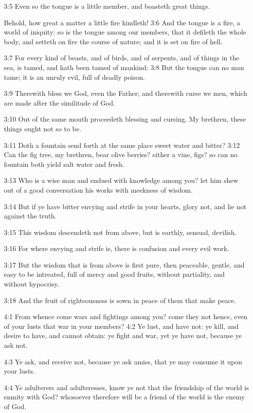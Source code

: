 3:5 Even so the tongue is a little member, and boasteth great things.

Behold, how great a matter a little fire kindleth!  3:6 And the tongue
is a fire, a world of iniquity: so is the tongue among our members,
that it defileth the whole body, and setteth on fire the course of
nature; and it is set on fire of hell.

3:7 For every kind of beasts, and of birds, and of serpents, and of
things in the sea, is tamed, and hath been tamed of mankind: 3:8 But
the tongue can no man tame; it is an unruly evil, full of deadly
poison.

3:9 Therewith bless we God, even the Father; and therewith curse we
men, which are made after the similitude of God.

3:10 Out of the same mouth proceedeth blessing and cursing. My
brethren, these things ought not so to be.

3:11 Doth a fountain send forth at the same place sweet water and
bitter?  3:12 Can the fig tree, my brethren, bear olive berries?
either a vine, figs? so can no fountain both yield salt water and
fresh.

3:13 Who is a wise man and endued with knowledge among you? let him
shew out of a good conversation his works with meekness of wisdom.

3:14 But if ye have bitter envying and strife in your hearts, glory
not, and lie not against the truth.

3:15 This wisdom descendeth not from above, but is earthly, sensual,
devilish.

3:16 For where envying and strife is, there is confusion and every
evil work.

3:17 But the wisdom that is from above is first pure, then peaceable,
gentle, and easy to be intreated, full of mercy and good fruits,
without partiality, and without hypocrisy.

3:18 And the fruit of righteousness is sown in peace of them that make
peace.

4:1 From whence come wars and fightings among you? come they not
hence, even of your lusts that war in your members?  4:2 Ye lust, and
have not: ye kill, and desire to have, and cannot obtain: ye fight and
war, yet ye have not, because ye ask not.

4:3 Ye ask, and receive not, because ye ask amiss, that ye may consume
it upon your lusts.

4:4 Ye adulterers and adulteresses, know ye not that the friendship of
the world is enmity with God? whosoever therefore will be a friend of
the world is the enemy of God.


